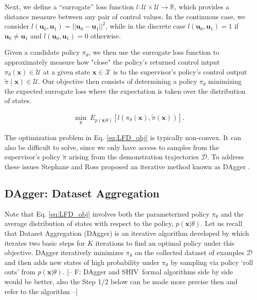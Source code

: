 \documentclass[10pt, conference]{ieeeconf}      %
\newcommand{\bu}{\mathbf{u}}
\newcommand{\bx}{\mathbf{x}}
\newcommand{\acro}{SHIV}
\begin{document}
Next, we define a ``surrogate'' loss function $l:\mathcal{U}\times \mathcal{U}\to \mathbb{R}$, which provides a distance
measure between any pair of control values. In the continuous case, we consider $l(\bu_0,\bu_1) = ||\bu_0-\bu_1||^2$,
while in the discrete case $l(\bu_0,\bu_1) = 1$ if $\bu_0 \neq \bu_1$ and $l(\bu_0, \bu_1)=0$ otherwise.

Given a candidate policy $\pi_{\theta}$, we then use the surrogate loss function to approximately measure how "close" the policy's
returned control intput $\pi_{\theta}(\bx)\in \mathcal{U}$ at a given state $\bx\in \mathcal{X}$ is to the supervisor's policy's control output
$\tilde{\pi}(\bx)\in \mathcal{U}$. Our objective then consists of determining a policy $\pi_{\theta}$ minimizing the expected surrogate loss where the expectation is taken over the distribution of states. 

 \vspace{-2ex}
\begin{align}\label{eq:LFD_obj}
\underset{\theta}{\min} \: E_{p(\bx|\theta)} [l(\pi_\theta(\bx),\tilde{\pi}(\bx))].
\end{align}
 
The optimization problem in Eq. \ref{eq:LFD_obj} is  typically non-convex. It can also be difficult to solve, since we only have access to samples from the supervisor's policy $\tilde{\pi}$ arising from the demonstration trajectories $\mathcal{D}$. To address these issues Stephane and Ross proposed an iterative method known as DAgger \cite{ross2010reduction}.

 \subsection{DAgger: Dataset Aggregation}
Note that Eq. \ref{eq:LFD_obj} involves both the parameterized policy $\pi_{\theta}$ and the average distribution of
states with respect to the policy, $p(\bx|\theta)$. Let us recall that Dataset Aggregation (DAgger) is an iterative algorithm developed by \cite{ross2010reduction} which iterates two basic steps for $K$ iterations to find an optimal policy under this objective. 
DAgger iteratively minimizes $\pi_{\theta}$ on the collected dataset of examples $\mathcal{D}$ and then adds new states
of high probability under $\pi_\theta$ by sampling via policy `roll outs' from $p(\bx|\theta)$. 
{\color{blue} [-- F: DAgger and \acro~formal algorithms side by side would be better, also the Step 1/2 below can be
made more precise then and refer to the algorithm --]}
\end{document}
